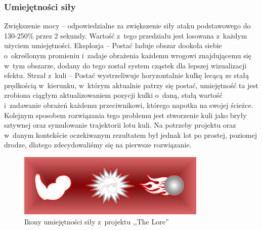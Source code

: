 \documentclass[oneside,polski,logo]{amuthesis}
\begin{document}
\subsubsection{Umiejętności siły}
Zwiększenie mocy – odpowiedzialne za zwiększenie siły ataku podstawowego do 130-250\% przez 2 sekundy. Wartość z~tego przedziału jest losowana z~każdym użyciem umiejętności.
Eksplozja – Postać ładuje obszar dookoła siebie o~określonym promieniu i~zadaje obrażenia każdemu wrogowi znajdującemu się w~tym obszarze, dodany do tego został system cząstek dla lepszej wizualizacji efektu.
Strzał z~kuli – Postać wystrzeliwuje horyzontalnie kulkę lecącą ze stałą prędkością w~kierunku, w~którym aktualnie patrzy się postać, umiejętność ta jest zrobiona ciągłym aktualizowaniem pozycji kulki o~daną, stałą wartość i~zadawanie obrażeń każdemu przeciwnikowi, którego napotka na swojej ścieżce. Kolejnym sposobem rozwiązania tego problemu jest stworzenie kuli jako bryły sztywnej oraz symulowanie trajektorii lotu kuli. Na potrzeby projektu oraz w~danym kontekście oczekiwanym rezultatem był jednak lot po prostej, poziomej drodze, dlatego zdecydowaliśmy się na pierwsze rozwiązanie.

\begin{figure}[h]
	\centering
	\includegraphics[width=9cm]{images/kozubal/sila.png}
	\caption{Ikony umiejętności siły z~projektu ,,The Lore''}
\end{figure}
\end{document}
